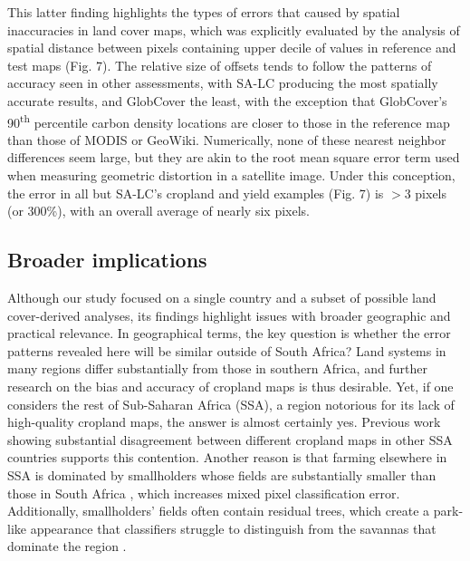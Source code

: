 \documentclass[a4paper]{article}
\begin{document}
This latter finding highlights the types of errors that caused by spatial inaccuracies in land cover maps, which was explicitly evaluated by the analysis of spatial distance between pixels containing upper decile of values in reference and test maps (Fig. 7).  The relative size of offsets tends to follow the patterns of accuracy seen in other assessments, with SA-LC producing the most spatially accurate results, and GlobCover the least, with the exception that GlobCover's 90\textsuperscript{th} percentile carbon density locations are closer to those in the reference map than those of MODIS or GeoWiki.  Numerically, none of these nearest neighbor differences seem large, but they are akin to the root mean square error term used when measuring geometric distortion in a satellite image. Under this conception, the error in all but SA-LC's cropland and yield examples (Fig. 7) is $>$3 pixels (or 300\%), with an overall average of nearly six pixels.  

\vspace{-0.3 cm}
\subsection*{Broader implications}
\vspace{-0.2 cm}
Although our study focused on a single country and a subset of possible land cover-derived analyses, its findings highlight issues with broader geographic and practical relevance. In geographical terms, the key question is whether the error patterns revealed here will be similar outside of South Africa? Land systems in many regions differ substantially from those in southern Africa, and further research on the bias and accuracy of cropland maps is thus desirable. Yet, if one considers the rest of Sub-Saharan Africa (SSA), a region notorious for its lack of high-quality cropland maps, the answer is almost certainly yes. Previous work showing substantial disagreement between different cropland maps in other SSA countries \citep{fritz_comparison_2010} supports this contention. Another reason is that farming elsewhere in SSA is dominated by smallholders whose fields are substantially smaller than those in South Africa \citep{samberg_subnational_2016}, which increases mixed pixel classification error. Additionally, smallholders' fields often contain residual trees, which create a park-like appearance that classifiers struggle to distinguish from the savannas that dominate the region \citep{estes_reconciling_2016,debats_generalized_2016,sweeney_mapping_2015}.   
\end{document}
